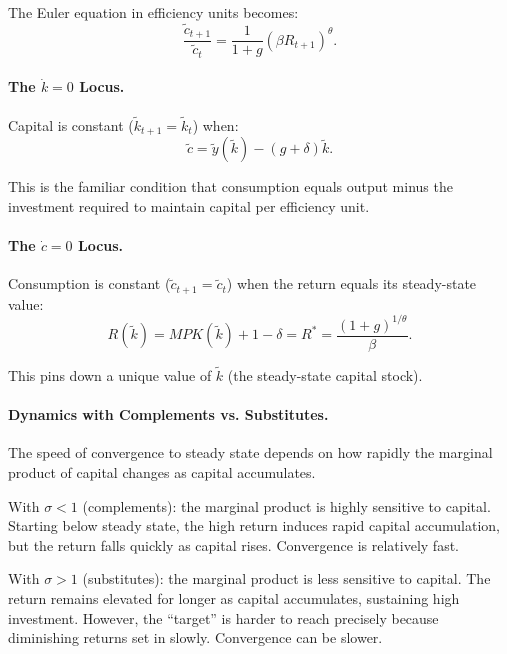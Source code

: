 The Euler equation in efficiency units becomes:
\begin{equation}
\frac{\tilde{c}_{t+1}}{\tilde{c}_t} = \frac{1}{1+g} \left( \beta R_{t+1} \right)^\theta.
\label{eq:euler-efficiency}
\end{equation}

\paragraph{The $\dot{k} = 0$ Locus.}
Capital is constant ($\tilde{k}_{t+1} = \tilde{k}_t$) when:
\begin{equation}
\tilde{c} = \tilde{y}(\tilde{k}) - (g + \delta) \tilde{k}.
\label{eq:k-dot-zero}
\end{equation}

This is the familiar condition that consumption equals output minus the investment required to maintain capital per efficiency unit.

\paragraph{The $\dot{c} = 0$ Locus.}
Consumption is constant ($\tilde{c}_{t+1} = \tilde{c}_t$) when the return equals its steady-state value:
\begin{equation}
R(\tilde{k}) = MPK(\tilde{k}) + 1 - \delta = R^* = \frac{(1+g)^{1/\theta}}{\beta}.
\label{eq:c-dot-zero}
\end{equation}

This pins down a unique value of $\tilde{k}$ (the steady-state capital stock).

\paragraph{Dynamics with Complements vs. Substitutes.}
The speed of convergence to steady state depends on how rapidly the marginal product of capital changes as capital accumulates.

With $\sigma < 1$ (complements): the marginal product is highly sensitive to capital. Starting below steady state, the high return induces rapid capital accumulation, but the return falls quickly as capital rises. Convergence is relatively fast.

With $\sigma > 1$ (substitutes): the marginal product is less sensitive to capital. The return remains elevated for longer as capital accumulates, sustaining high investment. However, the ``target'' is harder to reach precisely because diminishing returns set in slowly. Convergence can be slower.

